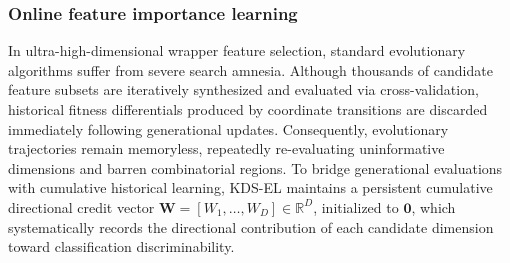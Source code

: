 \subsubsection{Online feature importance learning}

In ultra-high-dimensional wrapper feature selection, standard evolutionary algorithms suffer from severe search amnesia. Although thousands of candidate feature subsets are iteratively synthesized and evaluated via cross-validation, historical fitness differentials produced by coordinate transitions are discarded immediately following generational updates. Consequently, evolutionary trajectories remain memoryless, repeatedly re-evaluating uninformative dimensions and barren combinatorial regions. To bridge generational evaluations with cumulative historical learning, KDS-EL maintains a persistent cumulative directional credit vector $\mathbf{W} = [W_1, \dots, W_D] \in \mathbb{R}^D$, initialized to $\mathbf{0}$, which systematically records the directional contribution of each candidate dimension toward classification discriminability.

